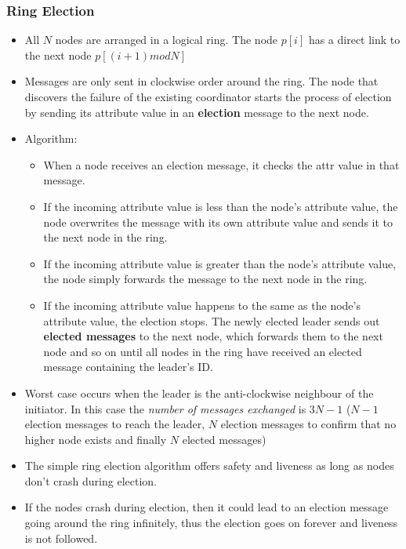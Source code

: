 \documentclass{article}
\begin{document}
\subsubsection{Ring Election}
\begin{itemize}
    \item All $N$ nodes are arranged in a logical ring. The node $p[i]$ has a direct link to the next node $p[(i+1) mod N]$
    
    \item Messages are only sent in clockwise order around the ring. The node that discovers the failure of the existing coordinator starts the process of election by sending its attribute value in an \textbf{election} message to the next node.
    
    \item Algorithm: 
    \begin{itemize}
        \item When a node receives an election message, it checks the attr value in that message. 
        
        \item If the incoming attribute value is less than the node's attribute value, the node overwrites the message with its own attribute value and sends it to the next node in the ring.
        
        \item If the incoming attribute value is greater than the node's attribute value, the node simply forwards the message to the next node in the ring. 
        
        \item If the incoming attribute value happens to the same as the node's attribute value, the election stops. The newly elected leader sends out \textbf{elected messages} to the next node, which forwards them to the next node and so on until all nodes in the ring have received an elected message containing the leader's ID. 
    \end{itemize}
    
    \item Worst case occurs when the leader is the anti-clockwise neighbour of the initiator. In this case the \textit{number of messages exchanged} is $3N - 1$ ($N-1$ election messages to reach the leader, $N$ election messages to confirm that no higher node exists and finally $N$ elected messages) 
    
    \item The simple ring election algorithm offers safety and liveness as long as nodes don't crash during election. 
    
    \item If the nodes crash during election, then it could lead to an election message going around the ring infinitely, thus the election goes on forever and liveness is not followed.
\end{itemize}
\end{document}
